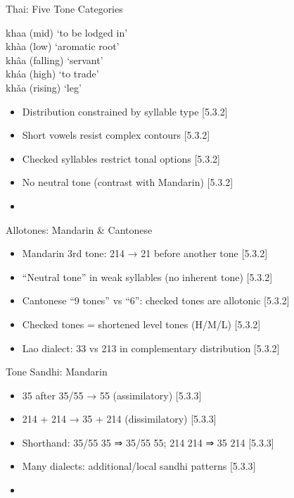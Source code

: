 \documentclass{beamer}
\newcommand{\booksrc}[1]{\hfill {\tiny [#1]}}
\begin{document}
\begin{frame}{Thai: Five Tone Categories}
\begin{exe}
\ex khaa (mid) ‘to be lodged in’ \\
\ex khàa (low) ‘aromatic root’ \\
\ex khâa (falling) ‘servant’ \\
\ex kháa (high) ‘to trade’ \\
\ex khǎa (rising) ‘leg’
\end{exe}
\begin{itemize}
\item Distribution constrained by syllable type \booksrc{5.3.2}
\item Short vowels resist complex contours \booksrc{5.3.2}
\item Checked syllables restrict tonal options \booksrc{5.3.2}
\item No neutral tone (contrast with Mandarin) \booksrc{5.3.2}
\item %
\end{itemize}
\end{frame}

\begin{frame}{Allotones: Mandarin \& Cantonese}
\begin{itemize}
\item Mandarin 3rd tone: 214 → 21 before another tone \booksrc{5.3.2}
\item “Neutral tone” in weak syllables (no inherent tone) \booksrc{5.3.2}
\item Cantonese “9 tones” vs “6”: checked tones are allotonic \booksrc{5.3.2}
\item Checked tones = shortened level tones (H/M/L) \booksrc{5.3.2}
\item Lao dialect: 33 vs 213 in complementary distribution \booksrc{5.3.2}
\end{itemize}
\end{frame}

\begin{frame}{Tone Sandhi: Mandarin}
\begin{itemize}
\item 35 after 35/55 → 55 (assimilatory) \booksrc{5.3.3}
\item 214 + 214 → 35 + 214 (dissimilatory) \booksrc{5.3.3}
\item Shorthand: 35/55 35 ⇒ 35/55 55; 214 214 ⇒ 35 214 \booksrc{5.3.3}
\item Many dialects: additional/local sandhi patterns \booksrc{5.3.3}
\item %
\end{itemize}
\end{frame}
\end{document}
